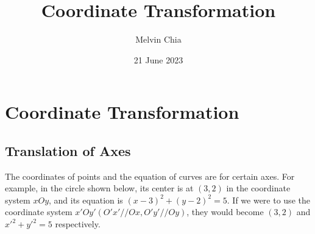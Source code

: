 \documentclass{report}
\title{\Huge{\textbf{Coordinate Transformation}}}
\author{Melvin Chia}
\date{21 June 2023}
\begin{document}
\maketitle

\onehalfspacing

\chapter{Coordinate Transformation}

\section{Translation of Axes}
The coordinates of points and the equation of curves are for certain axes. For
example, in the circle shown below, its center is at $(3, 2)$ in the coordinate
system $xOy$, and its equation is $(x - 3)^2 + (y - 2)^2 = 5$. If we were to
use the coordinate system $x'Oy' (O'x' // Ox, O'y' // Oy)$, they would become
$(3, 2)$ and $x'^2 + y'^2 = 5$ respectively.
\end{document}
